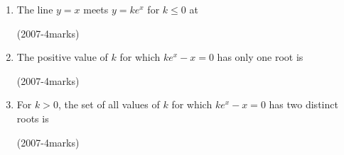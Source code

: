 \documentclass[journal,,12pt,twocolumn]{IEEEtran}
\theoremstyle{remark}
\begin{document}
\begin{enumerate}
\item The line $y=x$ meets $y=ke^x$ for $k \le 0$ at
    \begin{enumerate}
\end{enumerate}

  
\hfill {(2007-4marks)}\\


\item  The positive value of $k$ for which $ke^x-x=0$ has only one root is
\begin{enumerate}
\end{enumerate}

\hfill {(2007-4marks)}


\item For $k>0$, the set of all values of $k$ for which $ke^x-x=0$ has two distinct roots is 
\begin{enumerate}
\end{enumerate}

\hfill {(2007-4marks)}



\end{enumerate}
\end{document}
